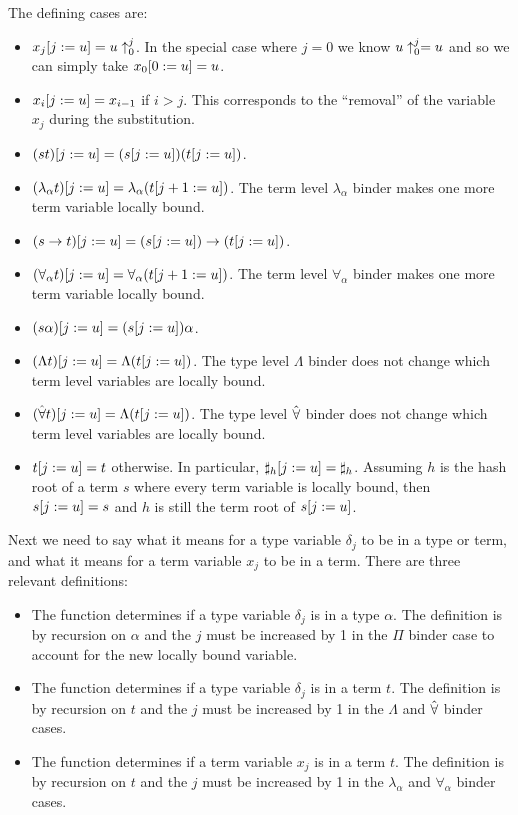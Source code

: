 \begin{itemize}
The defining cases are:
\begin{itemize}
\item $\dbsub{j}{u}{x_j} = \dbsh{0}{j}{u}$.
In the special case where $j=0$ we know $\dbsh{0}{j}{u} = u$
and so we can simply take $\dbsub{0}{u}{x_0} = u$.
\item $\dbsub{j}{u}{x_i} = x_{i-1}$ if $i>j$. This corresponds to the ``removal'' of the variable $x_j$ during the substitution.
\item $\dbsub{j}{u}{(st)} = (\dbsub{j}{u}{s}) (\dbsub{j}{u}{t})$.
\item $\dbsub{j}{u}{(\lambda_\alpha t)} = \lambda_\alpha (\dbsub{j+1}{u}{t})$. The term level $\lambda_\alpha$ binder makes one more term variable locally bound.
\item $\dbsub{j}{u}{(s\to t)} = (\dbsub{j}{u}{s}) \to (\dbsub{j}{u}{t})$.
\item $\dbsub{j}{u}{(\forall_\alpha t)} = \forall_\alpha (\dbsub{j+1}{u}{t})$. The term level $\forall_\alpha$ binder makes one more term variable locally bound.
\item $\dbsub{j}{u}{(s\alpha)} = (\dbsub{j}{u}{s}) \alpha$.
\item $\dbsub{j}{u}{(\Lambda t)} = \Lambda (\dbsub{j}{u}{t})$. The type level $\Lambda$ binder does not change which term level variables are locally bound.
\item $\dbsub{j}{u}{(\tforall t)} = \Lambda (\dbsub{j}{u}{t})$. The type level $\tforall$ binder does not change which term level variables are locally bound.
\item $\dbsub{j}{u}{t} = t$ otherwise. In particular, $\dbsub{j}{u}{\tmh{h}} = \tmh{h}$.
Assuming $h$ is the hash root of a term $s$ where every term variable is locally bound,
then $\dbsub{j}{u}{s} = s$
and $h$ is still the term root of $\dbsub{j}{u}{s}$.
\end{itemize}
\end{itemize}

Next we need to say what it means for a type variable $\delta_j$ to be {}
in a type or term, and what it means for a term variable $x_j$ to be {}
in a term.
There are three relevant definitions:
\begin{itemize}
\item The function {} determines if a type variable $\delta_j$
is {} in a type $\alpha$. The definition is by recursion on $\alpha$ and the $j$ must be
increased by 1 in the $\Pi$ binder case to account for the new locally bound variable.
\item The function {} determines if a type variable $\delta_j$
is {} in a term $t$. The definition is by recursion on $t$ and the $j$ must be
increased by 1 in the $\Lambda$ and $\tforall$ binder cases.
\item The function {} determines if a term variable $x_j$
is {} in a term $t$. The definition is by recursion on $t$ and the $j$ must be
increased by 1 in the $\lambda_\alpha$ and $\forall_\alpha$ binder cases.
\end{itemize}

